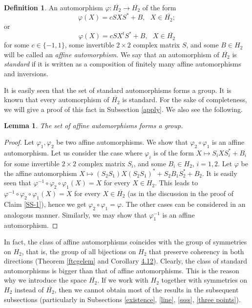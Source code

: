\documentclass[10pt,a4paper]{amsart}
\providecommand{\index}[1]{}
\newcommand\oH{{\overline{H_2}}}
\newtheorem{lemma}[theorem]{Lemma}
\theoremstyle{definition}
\newtheorem{definition}[theorem]{Definition}
\theoremstyle{remark}
\numberwithin{subsection}{section}
\numberwithin{equation}{section}
\begin{document}
\begin{definition}\label{automorphisms}
An automorphism $\varphi\colon \oH\to \oH$ of the form
\[
\varphi (X) = c SXS^\ast + B, \ \ \ X \in \oH;
\]
or
\[
\varphi (X) = c SX^t S^\ast + B, \ \ \ X \in \oH
\]
for some $c \in \{-1 , 1 \}$, some invertible $2 \times 2$ complex matrix $S$, and some $B \in H_2$ will be called an \emph{affine automorphism}\index{affine automorphism}. 
We say that an automorphism of $\oH$ is \emph{standard} \index{standard automorphism} if it is written as a composition of finitely many affine automorphisms and inversions.
\end{definition}
It is easily seen that the set of standard automorphisms forms a group.
It is known that every automorphism of $\oH$ is standard. 
For the sake of completeness, we will give a proof of this fact in Subsection \ref{apply}.
We also see the following. 

\begin{lemma}\label{simsim}
The set of affine automorphisms forms a group.
\end{lemma}
\begin{proof}
Let $\varphi_1, \varphi_2$ be two affine automorphisms. 
We show that $\varphi_2\circ \varphi_1$ is an affine automorphism. 
Let us consider the case where $\varphi_i$ is of the form $X\mapsto S_iXS_i^\ast + B_i$ for some invertible $2 \times 2$ complex matrix $S_i$, and some $B_i \in H_2$,  $i=1,2$. 
Let $\varphi$ be the affine automorphism $X\mapsto (S_2S_1)X(S_2S_1)^* + S_2B_1S_2^* +B_2$. 
It is easily seen that $\varphi^{-1}\circ \varphi_2\circ \varphi_1(X)=X$ for every $X\in H_2$. 
This leads to $\varphi^{-1}\circ \varphi_2\circ \varphi_1(X)=X$ for every $X\in \oH$ (as in the discussion in the proof of Claim \ref{SS-1}), hence we get $\varphi_2\circ \varphi_1=\varphi$. 
The other cases can be considered in an analogous manner. 
Similarly, we may show that $\varphi_1^{-1}$ is an affine automorphism.
\end{proof}

In fact, the class of affine automorphisms coincides with the group of symmetries on $H_2$, that is, the group of all bijections on $H_2$ that preserve coherency in both directions (Theorem \ref{ftcgelem} and Corollary \href{https://arxiv.org/abs/2406.18874v2}{4.12}).
Clearly, the class of standard automorphisms is bigger than that of affine automorphisms. 
This is the reason why we introduce the space $\oH$. 
If we work with $H_2$ together with symmetries on $H_2$ instead of $\oH$, then we cannot obtain most of the results in the subsequent subsections (particularly in Subsections \ref{existence}, \ref{line}, \ref{ssss}, \ref{three points}).
\end{document}
